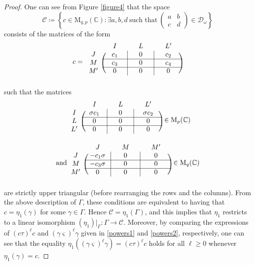 \documentclass[ALCO,Unicode]{cedram}
\newcommand{\Mat}{\mathrm{M}}
\newcommand{\condir}{\mathcal{D}}
\newcommand{\mC}{\mathbb{C}}
\begin{document}
\begin{proof}
One can see from Figure \ref{figure4} that the space
\[
\mathcal{C}\coloneqq \left\{ c\in\Mat_{q,p}(\mC):\exists a,b,d\ \mbox{such that}\ \begin{pmatrix} a & b\\ c & d \end{pmatrix}\in\condir_\omega\right\}
\]
consists of the matrices of the form
\[
c=\begin{blockarray}{cccc}
{} & {\quad I\quad} & {\quad L\quad} & {\quad L'\quad}\\
\begin{block}{c(c|c|c)}
J & c_1 & 0 & c_2\\
\cline{2-4}
M & c_3 & 0 & c_4\\
\cline{2-4}
M' & 0 & 0 & 0\\
\end{block}
\end{blockarray}
\]
such that the matrices
\begin{eqnarray*}
 & \begin{blockarray}{cccc}
{} & {\quad I\quad} & {\quad L\quad} & {\quad L'\quad}\\
\begin{block}{c(c|c|c)}
I & \sigma c_1 & 0 & \sigma c_2\\
\cline{2-4}
L & 0 & 0 & 0\\
\cline{2-4}
L' & 0 & 0 & 0\\
\end{block}
\end{blockarray}\in\Mat_p(\mC)\\
\mbox{and}&
\begin{blockarray}{cccc}
{} & {\quad J\quad} & {\quad M\quad} & {\quad M'\quad}\\
\begin{block}{c(c|c|c)}
J & -c_1\sigma & 0 & 0\\
\cline{2-4}
M & -c_3\sigma & 0 & 0\\
\cline{2-4}
M' & 0 & 0 & 0\\
\end{block}
\end{blockarray}\in\Mat_q(\mC)
\end{eqnarray*}
are strictly upper triangular (before rearranging the rows and the columns). From the above description of $\Gamma$, these conditions are equivalent to having that $c=\eta_1(\gamma)$ for some $\gamma\in\Gamma$. Hence $\mathcal{C}=\eta_1(\Gamma)$, and this implies that $\eta_1$ restricts to a linear isomorphism $(\eta_1)|_\Gamma:\Gamma\to \mathcal{C}$.
Moreover, by comparing the expressions of $(c\tau)^\ell c$ and $(\gamma\varsigma)^\ell\gamma$ given in \eqref{powers1} and \eqref{powers2}, respectively, one can see that the equality $\eta_1((\gamma\varsigma)^\ell\gamma)=(c\tau)^\ell c$ holds for all $\ell\geq 0$ whenever $\eta_1(\gamma)=c$.


\end{proof}
\end{document}

